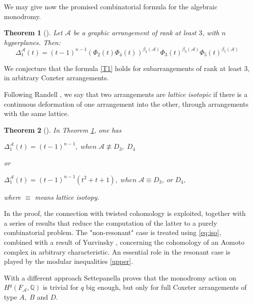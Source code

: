 \documentclass[psamsfonts]{conm-p-l}
\newtheorem{theorem}{Theorem}[section]
\theoremstyle{definition}
\theoremstyle{remark}
\numberwithin{equation}{section}
\newcommand{\A}{{\mathcal A}}
\newcommand{\Q}{\mathbb{Q}}
\begin{document}
We may give now the promised combinatorial formula for the algebraic monodromy.

\begin{theorem}[\cite{MP}]
\label{graph1}
Let $\A$ be a graphic arrangement of rank at least $3$, with $n$
hyperplanes. Then:
%
\begin{equation}
\label{T1}
\Delta_1^{\A}(t)= (t-1)^{n-1}
(\Phi_2(t)\Phi_4(t))^{\beta_2(\A)} \Phi_3(t)^{\beta_3(\A)}\Phi_5(t)^{\beta_5(\A)}
\end{equation}
\end{theorem} 

We conjecture that the formula \eqref{T1} holds for subarrangements of rank at least $3$,
in arbitrary Coxeter arrangements.

Following Randell \cite{Ra}, we say that two arrangements are  {\it lattice isotopic} if
there is a continuous deformation of one arrangement into the other, through 
arrangements with the same lattice.
  
\begin{theorem}[\cite{MP}]
\label{graph2}
In Theorem \ref{graph1}, one has
\begin{center}
\label{T21}
$\Delta_1^{\A}(t)= (t-1)^{n-1}, \; when \;\A \not\equiv D_3, \;D_4$
\end{center}
or
\begin{center}
\label{T22}
$\Delta_1^{\A}(t)= (t-1)^{n-1}(t^2+t+1), \; when \;\A\equiv D_3, \; or\; D_4,$
\end{center}
where $\equiv$ means lattice isotopy.
\end{theorem}
  
  
  In the proof, the connection with  twisted cohomology is exploited, 
  together with a series of results that reduce the computation of the latter  to
  a purely combinatorial problem. The "non-resonant" case  is treated using \eqref{eq:iso},
  combined with a result of Yuzvinsky \cite{Yuz},
  concerning the cohomology of an Aomoto complex in arbitrary characteristic.
  An essential role in the resonant case is played by the modular inequalities \eqref{upper}.

 With a different approach Settepanella \cite{Set} proves that 
 the monodromy action on $H^q(F_{\A}, \Q)$ 
 is trivial for $q$ big enough, but only for full
 Coxeter arrangements of type $A,\;B$ and $D$.



\end{document}
